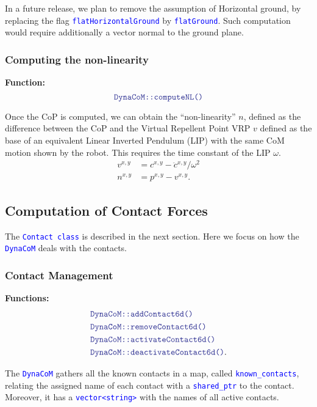 \documentclass[12pt]{article}
\newcommand{\code}[2][Blue]{\textcolor{#1}{\texttt{#2}}}
\begin{document}
In a future release, we plan to remove the assumption of Horizontal ground, by replacing the flag \code{flatHorizontalGround} by \code{flatGround}. Such computation would require additionally a vector normal to the ground plane.

\subsubsection{Computing the non-linearity}

{\bf Function:}
\begin{equation*}
    \code{DynaCoM::computeNL()}
\end{equation*}

Once the CoP is computed, we can obtain the ``non-linearity'' $n$, defined as the difference between the CoP and the Virtual Repellent Point VRP $v$ defined as the base of an equivalent Linear Inverted Pendulum (LIP) with the same CoM motion shown by the robot. This requires the time constant of the LIP $ \omega $.
%
\begin{align}
    v^{x,y} &= c^{x,y} - \ddot{c}^{x,y}/\omega^2\\
    n^{x,y} &= p^{x,y} - v^{x,y}.
\end{align}

\clearpage
\newpage

\subsection{Computation of Contact Forces}
\hrulefill

The \code{Contact class} is described in the next section. Here we focus on how the \code{DynaCoM} deals with the contacts.

\subsubsection{Contact Management}

{\bf Functions:}
\begin{align*}
    &\code{DynaCoM::addContact6d()}\\
    &\code{DynaCoM::removeContact6d()}\\
    &\code{DynaCoM::activateContact6d()}\\
    &\code{DynaCoM::deactivateContact6d()}.
\end{align*}

The \code{DynaCoM} gathers all the known contacts in a map, called \code{known\_contacts}, relating the assigned name of each contact with a \code{shared\_ptr} to the contact. Moreover, it has a \code{vector<string>} with the names of all active contacts.
\end{document}
